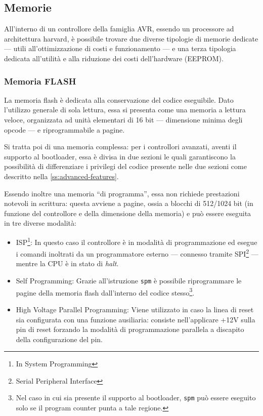 \subsection{Memorie}

All'interno di un controllore della famiglia AVR, essendo un processore ad architettura harvard, è possibile trovare due diverse tipologie di memorie dedicate --- utili all'ottimizzazione di costi e funzionamento --- e una terza tipologia dedicata all'utilità e alla riduzione dei costi dell'hardware (EEPROM).

\subsubsection{Memoria FLASH}
La memoria flash è dedicata alla conservazione del codice eseguibile.
Dato l'utilizzo generale di sola lettura, essa si presenta come una memoria a lettura veloce, organizzata ad unità elementari di 16 bit --- dimensione minima degli opcode\cite{avr:isa} --- e riprogrammabile a pagine.

Si tratta poi di una memoria complessa: per i controllori avanzati, aventi il supporto al bootloader, essa è divisa in due sezioni le quali garantiscono la possibilità di differenziare i privilegi del codice presente nelle due sezioni come descritto nella \cref{ss:advanced-features}.

Essendo inoltre una memoria ``di programma'', essa non richiede prestazioni notevoli in scrittura: questa avviene a pagine, ossia a blocchi di 512/1024 bit (in funzione del controllore e della dimensione della memoria) e può essere eseguita in tre diverse modalità:

\begin{itemize}
    \item ISP\footnote{In System Programming}: In questo caso il controllore è in modalità di programmazione ed esegue i comandi inoltrati da un programmatore esterno --- connesso tramite SPI\footnote{Serial Peripheral Interface} --- mentre la CPU è in stato di \textit{halt}.
    \item Self Programming: Grazie all'istruzione \texttt{spm} è possibile riprogrammare le pagine della memoria flash dall'interno del codice stesso\footnote{Nel caso in cui sia presente il supporto al bootloader, \texttt{spm} può essere eseguito solo se il program counter punta a tale regione.}.
    \item High Voltage Parallel Programming: Viene utilizzato in caso la linea di reset sia configurata con una funzione ausiliaria: consiste nell'applicare +12V sulla pin di reset forzando la modalità di programmazione parallela a discapito della configurazione del pin\cite[sec 28.6]{avr:m328p}.
\end{itemize}

